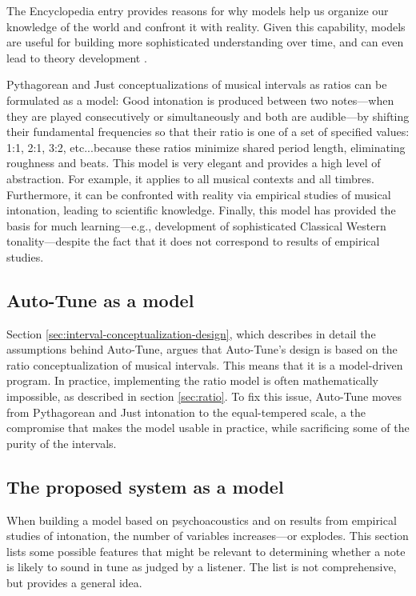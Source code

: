 The Encyclopedia entry provides reasons for why models help us organize our knowledge of the world and confront it with reality. Given this capability, models are useful for building more sophisticated understanding over time, and can even lead to theory development \cite{sep-models-science}.

Pythagorean and Just conceptualizations of musical intervals as ratios can be formulated as a model: Good intonation is produced between two notes---when they are played consecutively or simultaneously and both are audible---by shifting their fundamental frequencies so that their ratio is one of a set of specified values: 1:1, 2:1, 3:2, etc...because these ratios minimize shared period length, eliminating roughness and beats. This model is very elegant and provides a high level of abstraction. For example, it applies to all musical contexts and all timbres. Furthermore, it can be confronted with reality via empirical studies of musical intonation, leading to scientific knowledge. Finally, this model has provided the basis for much learning---e.g., development of sophisticated Classical Western tonality---despite the fact that it does not correspond to results of empirical studies. 

\subsection{Auto-Tune as a model}
Section \ref{sec:interval-conceptualization-design}, which describes in detail the assumptions behind Auto-Tune, argues that Auto-Tune's design is based on the ratio conceptualization of musical intervals. This means that it is a model-driven program. In practice, implementing the ratio model is often mathematically impossible, as described in section \ref{sec:ratio}. To fix this issue, Auto-Tune moves from Pythagorean and Just intonation to the equal-tempered scale, a the compromise that makes the model usable in practice, while sacrificing some of the purity of the intervals.

\subsection{The proposed system as a model}
\label{sec:proposed-as-model}
When building a model based on psychoacoustics and on results from empirical studies of intonation, the number of variables increases---or explodes. This section lists some possible features that might be relevant to determining whether a note is likely to sound in tune as judged by a listener. The list is not comprehensive, but provides a general idea.

